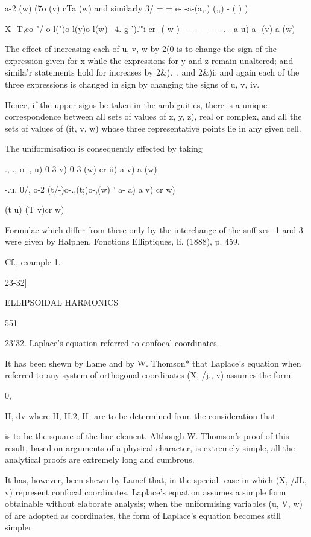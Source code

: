 {{{a-2 (w) (7o (v) cTa (w) and similarly 3/ = ± e- -a-(a,,) (,,) - ( ) )

X -T,co "/ o l(")o-l(y)o l(w) \ 4. g ').'"i cr- ( w ) - -- - --- - - .
- a u) a- (v) a (w)

The effect of increasing each of u, v, w by 2(0 is to change the sign
of the expression given for x while the expressions for y and z remain
unaltered; and simila'r statements hold for increases by 2\&).\ . and
2\&)i; and again each of the three expressions is changed in sign by
changing the signs of u, v, iv.

Hence, if the upper signs be taken in the ambiguities, there is a
unique correspondence between all sets of values of x, y, z), real or
complex, and all the sets of values of (it, v, w) whose three
representative points lie in any given cell.

The uniformisation is consequently effected by taking

., ., o-:, u) 0-3 v) 0-3 (w) cr ii) a v) a (w)

-.u. 0/, o-2 (t/-)o-.,(t;)o-,(w) ' a- a) a v) cr w)

(t u) (T v)cr w)

Formulae which differ from these only by the interchange of the
suffixes- 1 and 3 were given by Halphen, Fonctions Elliptiques, li.
(1888), p. 459.

 Cf., example 1.

23-32]

ELLIPSOIDAL HARMONICS

551

23'32. Laplace's equation referred to confocal coordinates.

It has been shewn by Lame and by W. Thomson* that Laplace's equation
when referred to any system of orthogonal coordinates (X, /j., v)
assumes the form

0,

H, dv where H, H.2, H- are to be determined from the consideration
that

is to be the square of the line-element. Although W. Thomson's proof
of this result, based on arguments of a physical character, is
extremely simple, all the analytical proofs are extremely long and
cumbrous.

It has, however, been shewn by Lamef that, in the special -case in
which (X, /JL, v) represent confocal coordinates, Laplace's equation
assumes a simple form obtainable without elaborate analysis; when the
uniformising variables (u, V, w) of are adopted as
coordinates, the form of Laplace's equation becomes still simpler.

}}}

